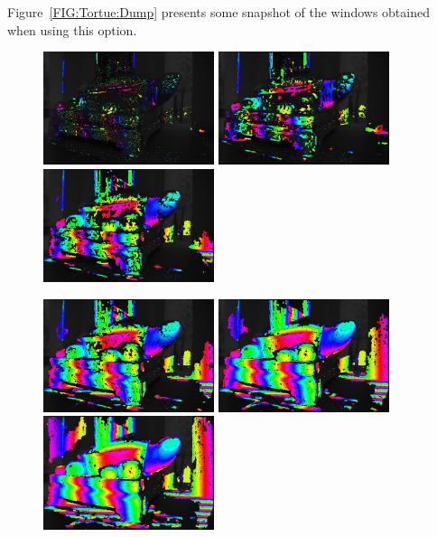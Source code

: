 Figure~\ref{FIG:Tortue:Dump} presents some snapshot of the windows obtained when using
this option.

\begin{figure}
\begin{center}
\includegraphics[width=50mm]{FIGS/Tortue/DumpMMTieP_0.jpg}
\includegraphics[width=50mm]{FIGS/Tortue/DumpMMTieP_1.jpg}
\includegraphics[width=50mm]{FIGS/Tortue/DumpMMTieP_2.jpg}

\includegraphics[width=50mm]{FIGS/Tortue/DumpMMTieP_3.jpg}
\includegraphics[width=50mm]{FIGS/Tortue/DumpMMTieP_4.jpg}
\includegraphics[width=50mm]{FIGS/Tortue/DumpMMTieP_5.jpg}


\end{center}
\end{figure}
